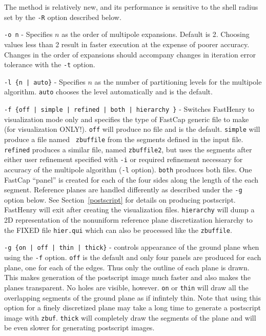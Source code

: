The method is relatively new, and its performance is sensitive to the
shell radius set by the {\tt -R} option described below.

\vspace{0.2in}
{\tt -o n} - Specifies $n$ as the order of multipole expansions.
Default is 2.  Choosing values less than 2 result in faster execution
at the expense of poorer accuracy.  Changes in the order of expansions
should accompany changes in iteration error tolerance with the {\tt -t} option.

\vspace{0.2in}
{\tt -l \{n | auto\}} - Specifies $n$ as the number of partitioning
levels for the multipole algorithm. {\tt auto} chooses the level
automatically and is the default.  

\vspace{0.2in}
{\tt -f \{off | simple | refined | both | hierarchy \}} - Switches FastHenry to
visualization mode only and specifies the type of FastCap generic file
to make (for visualization ONLY!).  {\tt off} will produce no file and
is the default.  {\tt simple} will produce a file named {\tt
zbuffile} from the segments defined in the input file.  {\tt
refined} produces a similar file, named {\tt zbuffile2}, but uses
the segments after either user refinement specified with {\tt -i} or
required refinement necessary for accuracy of the multipole algorithm
({\tt -l} option).  {\tt both} produces both files.  One FastCap
``panel'' is created for each of the four sides along the length of
the each segment.  Reference planes are handled differently as
described under the {\tt -g} option below.  See
Section~\ref{postscript} for details on producing postscript.  FastHenry will
exit after creating the visualization files. {\tt hierarchy} will dump
a 2D representation of the nonuniform reference plane discretization
hierarchy to the FIXED file {\tt hier.qui} which can also be processed
like the {\tt zbuffile}.

\vspace{0.2in}
{\tt -g \{on | off | thin | thick\}} - controls appearance of the
ground plane when using the {\tt -f} option. {\tt off} is the default
and only four panels are produced for each plane, one for each of the
edges.  Thus only the outline of each plane is drawn. This makes
generation of the postscript image much faster and also makes the planes 
transparent.  No holes are visible, however.  {\tt on} or {\tt thin}
will draw all the overlapping segments of the ground plane as if
infintely thin.  Note that using this option for a finely discretized
plane may take a long time to generate a postscript image with
{\tt zbuf}. {\tt thick} will completely draw the segments of the plane
and will be even slower for generating postscript images.

